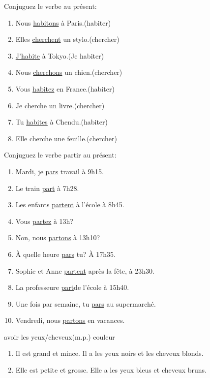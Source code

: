 \documentclass[./templates/main.tex]{subfiles}
\begin{document}
\begin{practice}
  Conjuguez le verbe au présent:
  \begin{enumerate}[label=(\arabic*)]
    \item Nous \underline{habitons} à Paris.(habiter)
    \item Elles \underline{cherchent} un stylo.(chercher)
    \item \underline{J'habite} à Tokyo.(Je habiter)
    \item Nous \underline{cherchons} un chien.(chercher)
    \item Vous \underline{habitez} en France.(habiter)
    \item Je \underline{cherche} un livre.(chercher)
    \item Tu \underline{habites} à Chendu.(habiter)
    \item Elle \underline{cherche} une feuille.(chercher)
  \end{enumerate}
\end{practice}
\begin{practice}
  Conjuguez le verbe partir au présent:
  \begin{enumerate}[label=(\arabic*)]
    \item Mardi, je \underline{pars} travail à 9h15.
    \item Le train \underline{part} à 7h28.
    \item Les enfants \underline{partent} à l’école à 8h45.
    \item Vous \underline{partez} à 13h?
    \item Non, nous \underline{partons} à 13h10?
    \item À quelle heure \underline{pars} tu? À 17h35.
    \item Sophie et Anne \underline{partent} après la fête, à 23h30.
    \item La professeure \underline{part}de l’école à 15h40.
    \item Une fois par semaine, tu \underline{pars} au supermarché.
    \item Vendredi, nous \underline{partons} en vacances.
  \end{enumerate}
\end{practice}
\begin{practice} avoir les yeux/cheveux(m.p.) couleur
  \begin{enumerate}[label=(\arabic*)]
    \item Il est grand et mince. Il a les yeux noirs et les cheveux blonds.
    \item Elle est petite et grosse. Elle a les yeux bleus et cheveux bruns.
  \end{enumerate}
\end{practice}
\end{document}
